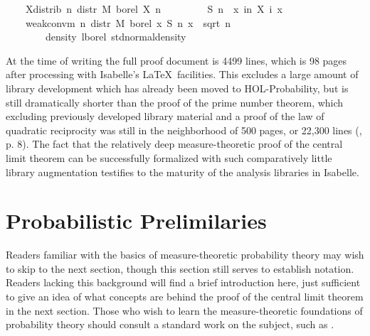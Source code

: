 \documentclass[leqno]{article}
\theoremstyle{definition}
\begin{document}
\begin{isabellebody}
\ \ \ \ X{\isacharunderscore}distrib{\isacharcolon}\ {\isachardoublequoteopen}{\isasymAnd}n{\isachardot}\ distr\ M\ borel\ {\isacharparenleft}X\ n{\isacharparenright}\ {\isacharequal}\ {\isasymmu}{\isachardoublequoteclose}\isanewline
\ \ \isanewline
\ \ \ \ {\isachardoublequoteopen}S\ n\ {\isasymequiv}\ {\isasymlambda}x{\isachardot}\ {\isasymSum}i{\isacharless}n{\isachardot}\ X\ i\ x{\isachardoublequoteclose}\isanewline
\ \ \isanewline
\ \ \ \ {\isachardoublequoteopen}weak{\isacharunderscore}conv{\isacharunderscore}m\ {\isacharparenleft}{\isasymlambda}n{\isachardot}\ distr\ M\ borel\ {\isacharparenleft}{\isasymlambda}x{\isachardot}\ S\ n\ x\ {\isacharslash}\ sqrt\ {\isacharparenleft}n\ {\isacharasterisk}\ {\isasymsigma}\ \isanewline
\ \ \ \ \ \ \ \ {\isacharparenleft}density\ lborel\ std{\isacharunderscore}normal{\isacharunderscore}density{\isacharparenright}{\isachardoublequoteclose}
\end{isabellebody}

\medskip

At the time of writing the full proof document is 4499 lines, which is 98 pages after processing with Isabelle's \LaTeX\ facilities. This excludes a large amount of library development which has already been moved to HOL-Probability, but is still dramatically shorter than the proof of the prime number theorem, which excluding previously developed library material and a proof of the law of quadratic reciprocity was still in the neighborhood of 500 pages, or 22,300 lines (\cite{avigad-etal-pnt}, p. 8). The fact that the relatively deep measure-theoretic proof of the central limit theorem can be successfully formalized with such comparatively little library augmentation testifies to the maturity of the analysis libraries in Isabelle.

\section{Probabilistic Prelimilaries} \label{sec:prelim}

Readers familiar with the basics of measure-theoretic probability theory may wish to skip to the next section, though this section still serves to establish notation. Readers lacking this background will find a brief introduction here, just sufficient to give an idea of what concepts are behind the proof of the central limit theorem in the next section. Those who wish to learn the measure-theoretic foundations of probability theory should consult a standard work on the subject, such as \cite{billingsley}.
\end{document}
